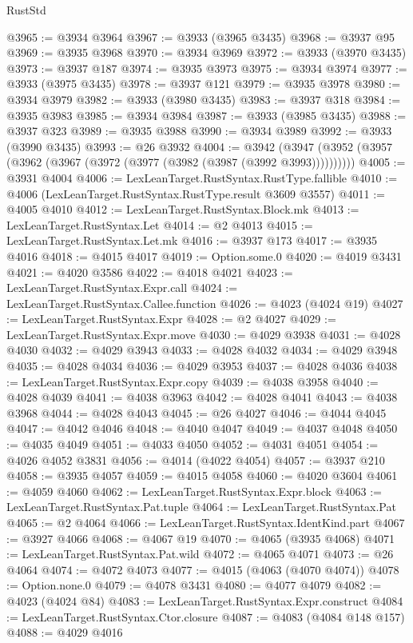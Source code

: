 \begin{lexlean}{RustStd}
\begin{coremodule}
@3965 := @3934 @3964
@3967 := @3933 (@3965 @3435)
@3968 := @3937 @95
@3969 := @3935 @3968
@3970 := @3934 @3969
@3972 := @3933 (@3970 @3435)
@3973 := @3937 @187
@3974 := @3935 @3973
@3975 := @3934 @3974
@3977 := @3933 (@3975 @3435)
@3978 := @3937 @121
@3979 := @3935 @3978
@3980 := @3934 @3979
@3982 := @3933 (@3980 @3435)
@3983 := @3937 @318
@3984 := @3935 @3983
@3985 := @3934 @3984
@3987 := @3933 (@3985 @3435)
@3988 := @3937 @323
@3989 := @3935 @3988
@3990 := @3934 @3989
@3992 := @3933 (@3990 @3435)
@3993 := @26 @3932
@4004 := @3942 (@3947 (@3952 (@3957 (@3962 (@3967 (@3972 (@3977 (@3982 (@3987 (@3992 @3993))))))))))
@4005 := @3931 @4004
@4006 := LexLeanTarget.RustSyntax.RustType.fallible
@4010 := @4006 (LexLeanTarget.RustSyntax.RustType.result @3609 @3557)
@4011 := @4005 @4010
@4012 := LexLeanTarget.RustSyntax.Block.mk
@4013 := LexLeanTarget.RustSyntax.Let
@4014 := @2 @4013
@4015 := LexLeanTarget.RustSyntax.Let.mk
@4016 := @3937 @173
@4017 := @3935 @4016
@4018 := @4015 @4017
@4019 := Option.some.{0}
@4020 := @4019 @3431
@4021 := @4020 @3586
@4022 := @4018 @4021
@4023 := LexLeanTarget.RustSyntax.Expr.call
@4024 := LexLeanTarget.RustSyntax.Callee.function
@4026 := @4023 (@4024 @19)
@4027 := LexLeanTarget.RustSyntax.Expr
@4028 := @2 @4027
@4029 := LexLeanTarget.RustSyntax.Expr.move
@4030 := @4029 @3938
@4031 := @4028 @4030
@4032 := @4029 @3943
@4033 := @4028 @4032
@4034 := @4029 @3948
@4035 := @4028 @4034
@4036 := @4029 @3953
@4037 := @4028 @4036
@4038 := LexLeanTarget.RustSyntax.Expr.copy
@4039 := @4038 @3958
@4040 := @4028 @4039
@4041 := @4038 @3963
@4042 := @4028 @4041
@4043 := @4038 @3968
@4044 := @4028 @4043
@4045 := @26 @4027
@4046 := @4044 @4045
@4047 := @4042 @4046
@4048 := @4040 @4047
@4049 := @4037 @4048
@4050 := @4035 @4049
@4051 := @4033 @4050
@4052 := @4031 @4051
@4054 := @4026 @4052 @3831
@4056 := @4014 (@4022 @4054)
@4057 := @3937 @210
@4058 := @3935 @4057
@4059 := @4015 @4058
@4060 := @4020 @3604
@4061 := @4059 @4060
@4062 := LexLeanTarget.RustSyntax.Expr.block
@4063 := LexLeanTarget.RustSyntax.Pat.tuple
@4064 := LexLeanTarget.RustSyntax.Pat
@4065 := @2 @4064
@4066 := LexLeanTarget.RustSyntax.IdentKind.part
@4067 := @3927 @4066
@4068 := @4067 @19
@4070 := @4065 (@3935 @4068)
@4071 := LexLeanTarget.RustSyntax.Pat.wild
@4072 := @4065 @4071
@4073 := @26 @4064
@4074 := @4072 @4073
@4077 := @4015 (@4063 (@4070 @4074))
@4078 := Option.none.{0}
@4079 := @4078 @3431
@4080 := @4077 @4079
@4082 := @4023 (@4024 @84)
@4083 := LexLeanTarget.RustSyntax.Expr.construct
@4084 := LexLeanTarget.RustSyntax.Ctor.closure
@4087 := @4083 (@4084 @148 @157)
@4088 := @4029 @4016

\end{coremodule}
\end{lexlean}

